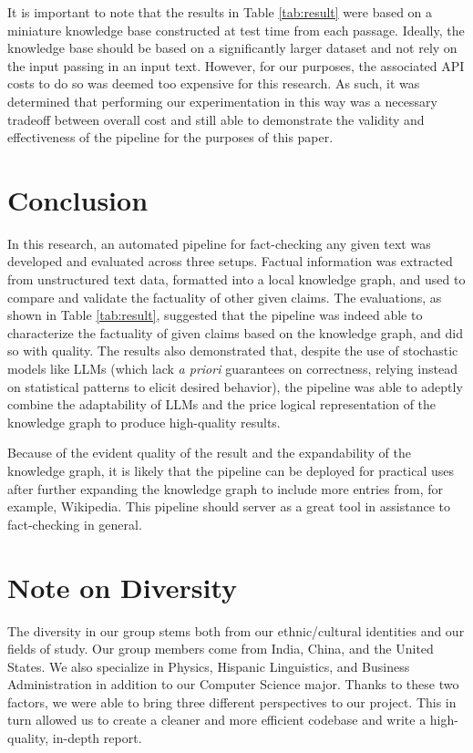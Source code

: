 \documentclass[11pt]{article}
\begin{document}
It is important to note that the results in Table \ref{tab:result} were based on a miniature knowledge base constructed at test time from each passage. Ideally, the knowledge base should be based on a significantly larger dataset and not rely on the input passing in an input text. However, for our purposes, the associated API costs to do so was deemed too expensive for this research. As such, it was determined that performing our experimentation in this way was a necessary tradeoff between overall cost and still able to demonstrate the validity and effectiveness of the pipeline for the purposes of this paper. 

\section{Conclusion}
In this research, an automated pipeline for fact-checking any given text was developed and evaluated across three setups. Factual information was extracted from unstructured text data, formatted into a local knowledge graph, and used to compare and validate the factuality of other given claims. The evaluations, as shown in Table \ref{tab:result}, suggested that the pipeline was indeed able to characterize the factuality of given claims based on the knowledge graph, and did so with quality. The results also demonstrated that, despite the use of stochastic models like LLMs (which lack \emph{a priori} guarantees on correctness, relying instead on statistical patterns to elicit desired behavior), the pipeline was able to adeptly combine the adaptability of LLMs and the price logical representation of the knowledge graph to produce high-quality results. 

Because of the evident quality of the result and the expandability of the knowledge graph, it is likely that the pipeline can be deployed for practical uses after further expanding the knowledge graph to include more entries from, for example, Wikipedia. This pipeline should server as a great tool in assistance to fact-checking in general. 

\section*{Note on Diversity}
The diversity in our group stems both from our ethnic/cultural identities and our fields of study. Our group members come from India, China, and the United States. We also specialize in Physics, Hispanic Linguistics, and Business Administration in addition to our Computer Science major. Thanks to these two factors, we were able to bring three different perspectives to our project. This in turn allowed us to create a cleaner and more efficient codebase and write a high-quality, in-depth report.
\end{document}

